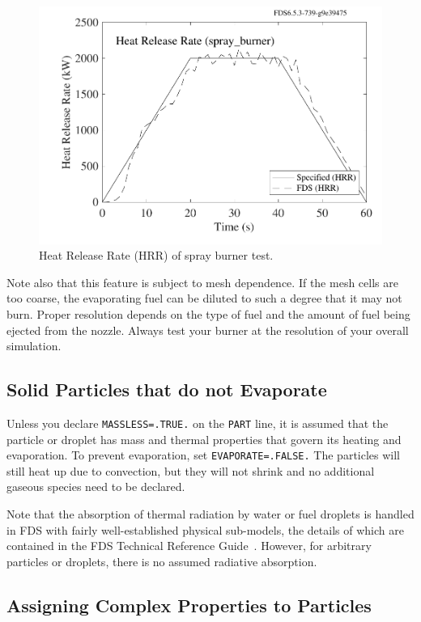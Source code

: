 \documentclass[11pt]{book}
\newcommand{\ct}{\tt\small}
\begin{document}
\begin{figure}[ht]
\begin{center}
\includegraphics[width=4.5in]{SCRIPT_FIGURES/spray_burner_HRR}
\end{center}
\caption[HRR of spray burner.]{Heat Release Rate (HRR) of spray burner test.}
\label{spray_burner}
\end{figure}

Note also that this feature is subject to mesh
dependence. If the mesh cells are too coarse, the
evaporating fuel can be diluted to such a degree that it
may not burn. Proper resolution depends on the type of
fuel and the amount of fuel being ejected from the
nozzle. Always test your burner at the resolution of your overall simulation.


\subsection{Solid Particles that do not Evaporate}

Unless you declare {\ct MASSLESS=.TRUE.} on the {\ct PART} line, it is assumed that the particle or droplet has mass and thermal properties that govern its
heating and evaporation. To prevent evaporation, set {\ct EVAPORATE=.FALSE.} The particles will still heat up due to convection, but they will not
shrink and no additional gaseous species need to be declared.

Note that the absorption of thermal radiation by water or fuel droplets is
handled in FDS with fairly well-established physical sub-models, the details
of which are contained in the FDS Technical Reference Guide~\cite{FDS_Math_Guide}.
However, for arbitrary particles or droplets, there is no assumed radiative absorption.


\subsection{Assigning Complex Properties to Particles}
\label{info:PART_SURF}
\end{document}
